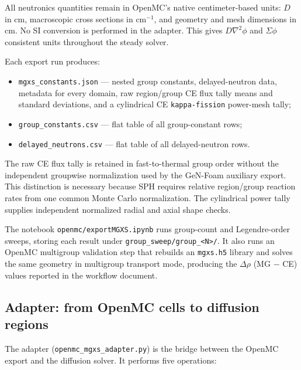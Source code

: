 \documentclass[11pt]{article}
\begin{document}
All neutronics quantities remain in OpenMC's native centimeter-based units:
$D$ in cm, macroscopic cross sections in cm$^{-1}$, and geometry and mesh
dimensions in cm.  No SI conversion is performed in the adapter.  This gives
$D\nabla^2\phi$ and $\Sigma\phi$ consistent units throughout the steady
solver.

Each export run produces:
\begin{itemize}
  \item \texttt{mgxs\_constants.json} --- nested group constants, delayed-neutron
        data, metadata for every domain, raw region/group CE flux tally means
        and standard deviations, and a cylindrical CE
        \texttt{kappa-fission} power-mesh tally;
  \item \texttt{group\_constants.csv} --- flat table of all group-constant rows;
  \item \texttt{delayed\_neutrons.csv} --- flat table of all delayed-neutron rows.
\end{itemize}

The raw CE flux tally is retained in fast-to-thermal group order without the
independent groupwise normalization used by the GeN-Foam auxiliary export.
This distinction is necessary because SPH requires relative region/group
reaction rates from one common Monte Carlo normalization.  The cylindrical
power tally supplies independent normalized radial and axial shape checks.

The notebook \texttt{openmc/exportMGXS.ipynb} runs group-count and
Legendre-order sweeps, storing each result under
\texttt{group\_sweep/group\_<N>/}.  It also runs an OpenMC multigroup
validation step that rebuilds an \texttt{mgxs.h5} library and solves the same
geometry in multigroup transport mode, producing the $\Delta\rho$ (MG $-$ CE)
values reported in the workflow document.

\subsection{Adapter: from OpenMC cells to diffusion regions}

The adapter (\texttt{openmc\_mgxs\_adapter.py}) is the bridge between the
OpenMC export and the diffusion solver.  It performs five operations:
\end{document}
